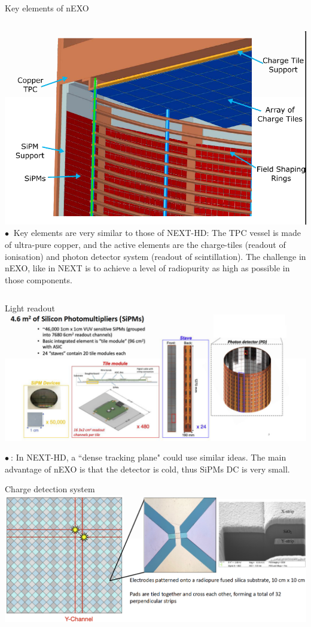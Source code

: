 \documentclass [aspectratio=169]{beamer}
\begin{document}

\begin{frame}{Key elements of nEXO}
\begin{columns}
\includegraphics[scale=0.20]{nexokey.png}
$\bullet~$ Key elements are very similar to those of NEXT-HD: The TPC vessel is made of ultra-pure copper, and the active elements are the charge-tiles (readout of ionisation) and photon detector system (readout of scintillation). The challenge in nEXO, like in NEXT is to achieve a level of radiopurity as high as possible in those components. 
\end{columns}
\end{frame}

\begin{frame}{Light readout}
\includegraphics[scale=0.25]{nexoLightReadout.png}

$\bullet~$: In NEXT-HD, a ``dense tracking plane" could use similar ideas. The main advantage of nEXO is that the detector is cold, thus SiPMs DC is very small.  
\end{frame}


\begin{frame}{Charge detection system}
\includegraphics[scale=0.25]{nexocharge.png}
\end{frame}
\end{document}
